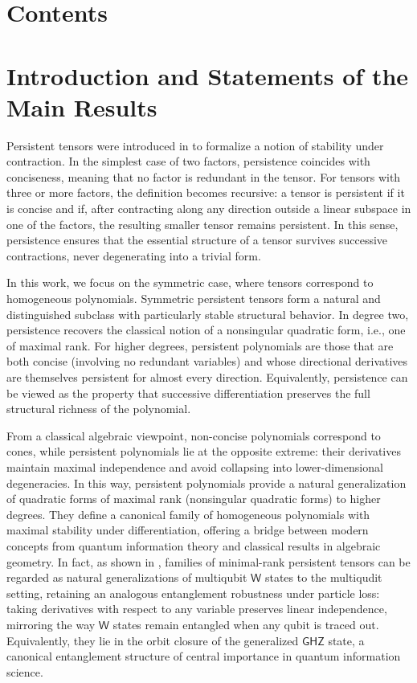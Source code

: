 \documentclass[aps,floatfix,groupedaddress,superscriptaddress,longbibliography,footinbib,notitlepage,showpacs]{revtex4-1}
\makeatletter
\newcommand{\mytableofcontents}{%
  \begingroup
    \let\clearpage\relax  %
    \section*{Contents}    %
    \@starttoc{toc}        %
  \endgroup
}
\makeatother
\begin{document}

\mytableofcontents
\section{Introduction and Statements of the Main Results}\label{sec.i}

Persistent tensors were introduced in \cite{GL24} to formalize a notion of stability under contraction. In the simplest case of two factors, persistence coincides with conciseness, meaning that no factor is redundant in the tensor. For tensors with three or more factors, the definition becomes recursive: a tensor is persistent if it is concise and if, after contracting along any direction outside a linear subspace in one of the factors, the resulting smaller tensor remains persistent. In this sense, persistence ensures that the essential structure of a tensor survives successive contractions, never degenerating into a trivial form.

In this work, we focus on the symmetric case, where tensors correspond to homogeneous polynomials. Symmetric persistent tensors form a natural and distinguished subclass with particularly stable structural behavior. In degree two, persistence recovers the classical notion of a nonsingular quadratic form, i.e., one of maximal rank. For higher degrees, persistent polynomials are those that are both concise (involving no redundant variables) and whose directional derivatives are themselves persistent for almost every direction. Equivalently, persistence can be viewed as the property that successive differentiation preserves the full structural richness of the polynomial.

From a classical algebraic viewpoint, non-concise polynomials correspond to cones, while persistent polynomials lie at the opposite extreme: their derivatives maintain maximal independence and avoid collapsing into lower-dimensional degeneracies. In this way, persistent polynomials provide a natural generalization of quadratic forms of maximal rank (nonsingular quadratic forms) to higher degrees. They define a canonical family of homogeneous polynomials with maximal stability under differentiation, offering a bridge between modern concepts from quantum information theory and classical results in algebraic geometry. In fact, as shown in \cite{GL24}, families of minimal-rank persistent tensors can be regarded as natural generalizations of multiqubit $\mathsf{W}$ states \cite{DVC} to the multiqudit setting, retaining an analogous entanglement robustness under particle loss: taking derivatives with respect to any variable preserves linear independence, mirroring the way $\mathsf{W}$ states remain entangled when any qubit is traced out. Equivalently, they lie in the orbit closure of the generalized $\mathsf{GHZ}$ state, a canonical entanglement structure of central importance in quantum information science.
\end{document}
